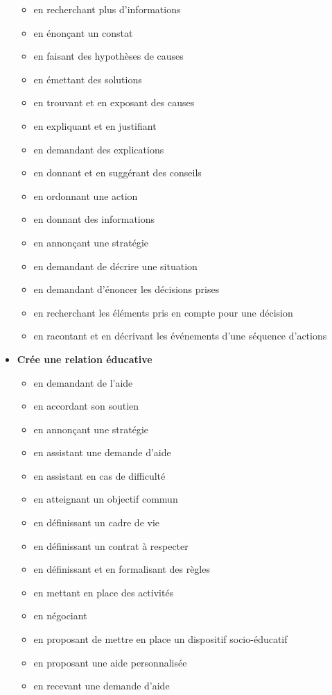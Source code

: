 \documentclass[8pt,a4paper]{article}
\begin{document}
\begin{itemize}
\begin{itemize}
\item en recherchant plus d'informations  
\item en énonçant un constat
\item en faisant des hypothèses de causes
\item en émettant des solutions
\item en trouvant et en exposant des causes  
\item en expliquant et en justifiant
\item en demandant des explications
\item en donnant et en suggérant des conseils  
\item en ordonnant une action
\item en donnant des informations
\item en annonçant une stratégie  
\item en demandant de décrire une situation  
\item en demandant d'énoncer les décisions prises  
\item en recherchant les éléments pris en compte pour une décision
\item en racontant et en décrivant les événements d'une séquence d'actions
\\ 
 \end{itemize}
\item \textbf{Crée une relation éducative}
\begin{itemize}
\item en demandant de l'aide
\item en accordant son soutien
\item en annonçant une stratégie  
\item en assistant une demande d'aide
\item en assistant en cas de difficulté 
\item en atteignant un objectif commun
\item en définissant un cadre de vie
\item en définissant un contrat à respecter
\item en définissant et en formalisant des règles
\item en mettant en place des activités  
\item en négociant
\item en proposant de mettre en place un dispositif socio-éducatif
\item en proposant une aide personnalisée
\item en recevant une demande d'aide

\end{itemize}
\end{itemize}
\end{document}
